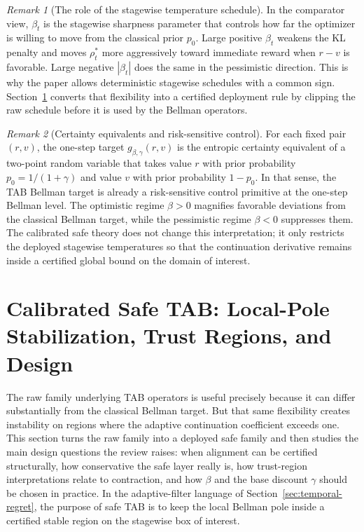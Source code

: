 \documentclass{article}
\theoremstyle{remark}
\newtheorem{remark}[remark]{Remark}
\begin{document}
\begin{remark}[The role of the stagewise temperature schedule]
\label{rem:beta-learning-rate}
In the comparator view, $\beta_t$ is the stagewise sharpness parameter that controls how far the optimizer is willing to move from the classical prior $p_0$.
Large positive $\beta_t$ weakens the KL penalty and moves $\rho_t^*$ more aggressively toward immediate reward when $r-v$ is favorable.
Large negative $|\beta_t|$ does the same in the pessimistic direction.
This is why the paper allows deterministic stagewise schedules with a common sign.
Section~\ref{sec:safe} converts that flexibility into a certified deployment rule by clipping the raw schedule before it is used by the Bellman operators.
\end{remark}

\begin{remark}[Certainty equivalents and risk-sensitive control]
\label{rem:certainty-equivalent}
For each fixed pair $(r,v)$, the one-step target $g_{\beta,\gamma}(r,v)$ is the entropic certainty equivalent of a two-point random variable that takes value $r$ with prior probability $p_0=1/(1+\gamma)$ and value $v$ with prior probability $1-p_0$.
In that sense, the TAB Bellman target is already a risk-sensitive control primitive at the one-step Bellman level.
The optimistic regime $\beta>0$ magnifies favorable deviations from the classical Bellman target, while the pessimistic regime $\beta<0$ suppresses them.
The calibrated safe theory does not change this interpretation; it only restricts the deployed stagewise temperatures so that the continuation derivative remains inside a certified global bound on the domain of interest.
\end{remark}

\section{Calibrated Safe TAB: Local-Pole Stabilization, Trust Regions, and Design}
\label{sec:safe}

The raw family underlying TAB operators is useful precisely because it can differ substantially from the classical Bellman target. But that same flexibility creates instability on regions where the adaptive continuation coefficient exceeds one. This section turns the raw family into a deployed safe family and then studies the main design questions the review raises: when alignment can be certified structurally, how conservative the safe layer really is, how trust-region interpretations relate to contraction, and how $\beta$ and the base discount $\gamma$ should be chosen in practice. In the adaptive-filter language of Section~\ref{sec:temporal-regret}, the purpose of safe TAB is to keep the local Bellman pole inside a certified stable region on the stagewise box of interest.
\end{document}

